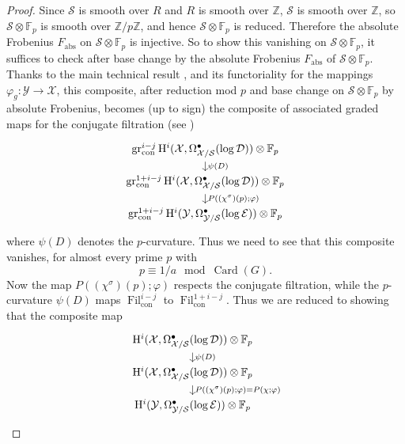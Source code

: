 \begin{proof}
Since \(\mathcal{S}\) is smooth over \(R\) and \(R\) is smooth over \(\mathbb{Z}\), \(\mathcal{S}\) is smooth over \(\mathbb{Z}\), so \(\mathcal{S}\otimes\mathbb{F}_p\) is smooth over \(\mathbb{Z}/p\mathbb{Z}\), and hence \(\mathcal{S}\otimes\mathbb{F}_p\) is reduced. Therefore the absolute Frobenius \(F_{\mathrm{abs}}\) on \(\mathcal{S}\otimes\mathbb{F}_p\) is injective. So to show this vanishing on \(\mathcal{S}\otimes\mathbb{F}_p\), it suffices to check after base change by the absolute Frobenius \(F_{\mathrm{abs}}\) of \(\mathcal{S}\otimes\mathbb{F}_p\). Thanks to the main technical result \cite[3.2]{Ka-ASDE}, and its functoriality for the mappings \(\varphi_g:\mathcal{Y}\to\mathcal{X}\), this composite, after reduction mod \(p\) and base change on \(\mathcal{S}\otimes\mathbb{F}_p\) by absolute Frobenius, becomes (up to sign) the composite of associated graded maps for the conjugate filtration (see \cite[2.3]{Ka-ASDE})
\[
\begin{tikzcd}[column sep=large,row sep=small]
\operatorname{gr}^{i-j}_{\mathrm{con}}\mathrm{H}^i(\mathcal{X},\Omega^\bullet_{\mathcal{X}/\mathcal{S}}(\log\mathcal{D}))\otimes\mathbb{F}_p
\arrow[d,"\psi(D)"]\\
\operatorname{gr}^{1+i-j}_{\mathrm{con}}\mathrm{H}^i(\mathcal{X},\Omega^\bullet_{\mathcal{X}/\mathcal{S}}(\log\mathcal{D}))\otimes\mathbb{F}_p
\arrow[d,"P((\chi^\sigma)(p);\varphi)"]\\
\operatorname{gr}^{1+i-j}_{\mathrm{con}}\mathrm{H}^i(\mathcal{Y},\Omega^\bullet_{\mathcal{Y}/\mathcal{S}}(\log\mathcal{E}))\otimes\mathbb{F}_p
\end{tikzcd}
\]
where \(\psi(D)\) denotes the \(p\)-curvature. Thus we need to see that this composite vanishes, for almost every prime \(p\) with
\[
p\equiv 1/a\mod \operatorname{Card}(G).
\]
Now the map \(P((\chi^\sigma)(p);\varphi)\) respects the conjugate filtration, while the \(p\)-curvature \(\psi(D)\) maps \(\operatorname{Fil}^{i-j}_{\mathrm{con}}\) to \(\operatorname{Fil}^{1+i-j}_{\mathrm{con}}\). Thus we are reduced to showing that the composite map
\[
\begin{tikzcd}[column sep=large,row sep=small]
\mathrm{H}^i(\mathcal{X},\Omega^\bullet_{\mathcal{X}/\mathcal{S}}(\log\mathcal{D}))\otimes\mathbb{F}_p
\arrow[d,"\psi(D)"]\\
\mathrm{H}^i(\mathcal{X},\Omega^\bullet_{\mathcal{X}/\mathcal{S}}(\log\mathcal{D}))\otimes\mathbb{F}_p
\arrow[d,"P((\chi^\sigma)(p);\varphi)=P(\chi;\varphi)"]\\
\mathrm{H}^i(\mathcal{Y},\Omega^\bullet_{\mathcal{Y}/\mathcal{S}}(\log\mathcal{E}))\otimes\mathbb{F}_p

\end{tikzcd}\]
\end{proof}
